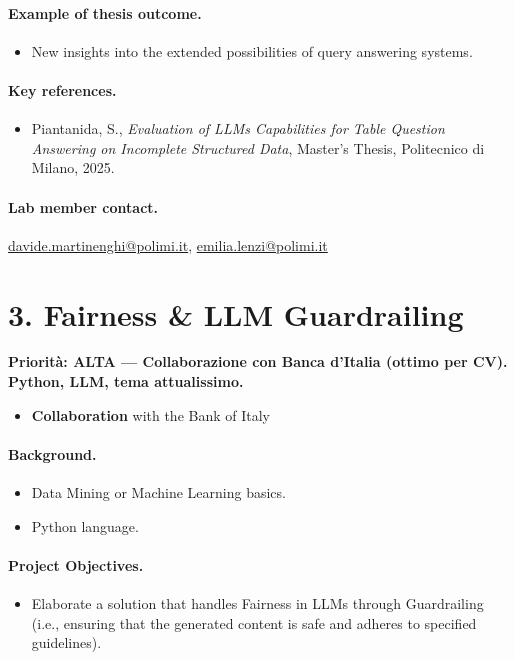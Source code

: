 \documentclass[a4paper,11pt]{article}
\newcommand{\priorita}[1]{%
  \par\smallskip\noindent\textbf{Priorit\`a: #1}\par\smallskip
}
\begin{document}
\paragraph{Example of thesis outcome.}
\begin{itemize}[nosep]
  \item New insights into the extended possibilities of query answering systems.
\end{itemize}

\paragraph{Key references.}
\begin{itemize}[nosep]
  \item Piantanida, S., \emph{Evaluation of LLMs Capabilities for Table Question Answering on Incomplete Structured Data}, Master's Thesis, Politecnico di Milano, 2025.
\end{itemize}

\paragraph{Lab member contact.}
\url{davide.martinenghi@polimi.it}, \url{emilia.lenzi@polimi.it}


\section{3. Fairness \& LLM Guardrailing}

\priorita{ALTA --- Collaborazione con Banca d'Italia (ottimo per CV). Python, LLM, tema attualissimo.}

\begin{itemize}[nosep]
  \item \textbf{Collaboration} with the Bank of Italy
\end{itemize}

\paragraph{Background.}
\begin{itemize}[nosep]
  \item Data Mining or Machine Learning basics.
  \item Python language.
\end{itemize}

\paragraph{Project Objectives.}
\begin{itemize}[nosep]
  \item Elaborate a solution that handles Fairness in LLMs through Guardrailing (i.e., ensuring that the generated content is safe and adheres to specified guidelines).
\end{itemize}
\end{document}

